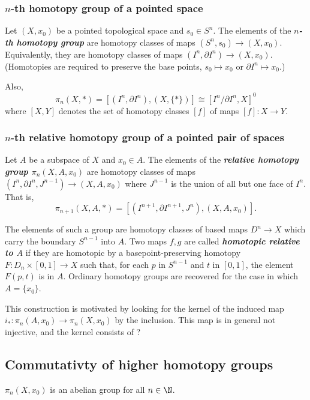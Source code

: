 \subsubsection{\texorpdfstring{$n$}{n}-th homotopy group of a pointed space}

\begin{defn}
	Let $(X,x_0)$ be a pointed topological space and $s_0\in S^n$. The elements of the \textbf{\textit{$n$-th homotopy group}} are homotopy classes of maps $(S^n,s_0)\to (X,x_0)$. Equivalently, they are homotopy classes of maps $(I^n,\partial I^n)\to (X,x_0)$. (Homotopies are required to preserve the base points, $s_0\mapsto x_0$ or $\partial I^n\mapsto x_0$.)
		
	Also,
	\[\pi_n(X,*)=[(I^n,\partial I^n),(X,\{*\})]\cong[I^n/\partial I^n,X]^0\]
	where $[X,Y]$ denotes the set of homotopy classes $[f]$ of maps $[f]:X\to Y$.
\end{defn}

\subsubsection{\texorpdfstring{$n$}{n}-th relative homotopy group of a pointed pair of spaces}
Let $A$ be a subspace of $X$ and $x_0\in A$. The elements of the \textbf{\textit{relative homotopy group $\pi_n(X,A,x_0)$}} are homotopy classes of maps $(I^n,\partial I^n,J^{n-1})\to (X,A,x_0)$ where $J^{n-1}$ is the union of all but one face of $I^n$. That is,
		\[\pi_{n+1}(X,A,*)=[(I^{n+1},\partial I^{n+1},J^n),(X,A,x_0)].\]
		
		The elements of such a group are homotopy classes of based maps $D^n\to X$ which carry the boundary $S^{n-1}$ into $A$. Two maps $f,g$ are called \textbf{\textit{homotopic relative to $A$}} if they are homotopic by a basepoint-preserving homotopy $F:D_n\times[0,1]\to X$ such that, for each $p$ in $S^{n-1}$ and $t$ in $[0,1]$, the element $F(p,t)$ is in $A$. Ordinary homotopy groups are recovered for the case in which $A=\{x_0\}$.
\begin{remark}
	This construction is motivated by looking for the kernel of the induced map $i_*:\pi_n(A,x_0)\to\pi_n(X,x_0)$ by the inclusion. This map is in general not injective, and the kernel consists of ?
\end{remark}

\subsection{Commutativty of higher homotopy groups}
\begin{prop}
	$\pi_n(X,x_0)$ is an abelian group for all $n\in\N$.
\end{prop}

